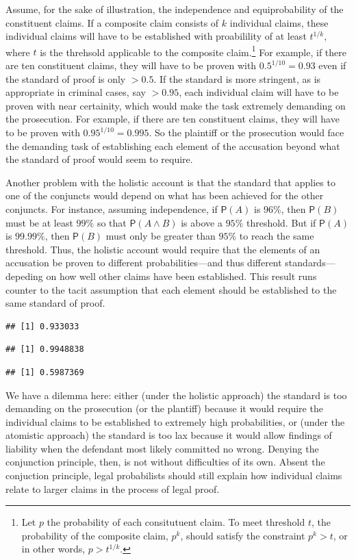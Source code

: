 \documentclass[10pt,dvipsnames,enabledeprecatedfontcommands]{scrartcl}
\newcommand{\et}{\wedge}
\newcommand{\pr}[1]{\mathsf{P}(#1)}
\begin{document}
Assume, for the sake of illustration, the independence and
equiprobability of the constituent claims. If a composite claim consists
of \(k\) individual claims, these individual claims will have to be
established with proabilility of at least \(t^{1/k}\), where \(t\) is
the threhsold applicable to the composite
claim.\footnote{Let $p$ the probability of each consitutuent claim. To meet threshold $t$, the probability of the composite claim, $p^k$, should satisfy the constraint $p^k>t$, or in other words, $p>t^{1/k}$.}
For example, if there are ten constituent claims, they will have to be
proven with \(0.5^{1/10}=0.93\) even if the standard of proof is only
\(>0.5\). If the standard is more stringent, as is appropriate in
criminal cases, say \(>0.95\), each individual claim will have to be
proven with near certainity, which would make the task extremely
demanding on the prosecution. For example, if there are ten constituent
claims, they will have to be proven with \(0.95^{1/10}=0.995\). So the
plaintiff or the prosecution would face the demanding task of
establishing each element of the accusation beyond what the standard of
proof would seem to require.

Another problem with the holistic account is that the standard that
applies to one of the conjuncts would depend on what has been achieved
for the other conjuncts. For instance, assuming independence, if
\(\pr{A}\) is \(96\%\), then \(\pr{B}\) must be at least \(99\%\) so
that \(\pr{A\et B}\) is above a \(95\%\) threshold. But if \(\pr{A}\) is
\(99.99\%\), then \(\pr{B}\) must only be greater than \(95\%\) to reach
the same threshold. Thus, the holistic account would require that the
elements of an accusation be proven to different probabilities---and
thus different standards---depeding on how well other claims have been
established. This result runs counter to the tacit assumption that each
element should be established to the same standard of proof.

\begin{verbatim}
## [1] 0.933033
\end{verbatim}

\begin{verbatim}
## [1] 0.9948838
\end{verbatim}

\begin{verbatim}
## [1] 0.5987369
\end{verbatim}

We have a dilemma here: either (under the holistic approach) the
standard is too demanding on the prosecution (or the plantiff) because
it would require the individual claims to be established to extremely
high probabilities, or (under the atomistic approach) the standard is
too lax because it would allow findings of liability when the defendant
most likely committed no wrong. Denying the conjunction principle, then,
is not without difficulties of its own. Absent the conjuction principle,
legal probabilists should still explain how individual claims relate to
larger claims in the process of legal proof.
\end{document}

